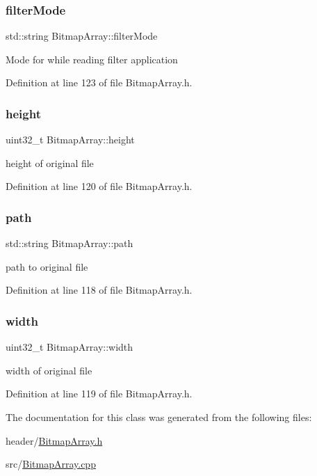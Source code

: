\subsubsection{\texorpdfstring{filterMode}{filterMode}}
{\footnotesize\ttfamily std\+::string Bitmap\+Array\+::filter\+Mode\hspace{0.3cm}{\ttfamily [private]}}

Mode for while reading filter application 

Definition at line 123 of file Bitmap\+Array.\+h.

\mbox{\label{classBitmapArray_adb8d1a8fcc55c3884ad3eea71c6042be}} 
\subsubsection{\texorpdfstring{height}{height}}
{\footnotesize\ttfamily uint32\+\_\+t Bitmap\+Array\+::height\hspace{0.3cm}{\ttfamily [private]}}

height of original file 

Definition at line 120 of file Bitmap\+Array.\+h.

\mbox{\label{classBitmapArray_a3a3e1fbdd198c6731c7f6e20fb492445}} 
\subsubsection{\texorpdfstring{path}{path}}
{\footnotesize\ttfamily std\+::string Bitmap\+Array\+::path\hspace{0.3cm}{\ttfamily [private]}}

path to original file 

Definition at line 118 of file Bitmap\+Array.\+h.

\mbox{\label{classBitmapArray_a44f51b2c1ecde3f9aa504df25d65b6c9}} 
\subsubsection{\texorpdfstring{width}{width}}
{\footnotesize\ttfamily uint32\+\_\+t Bitmap\+Array\+::width\hspace{0.3cm}{\ttfamily [private]}}

width of original file 

Definition at line 119 of file Bitmap\+Array.\+h.



The documentation for this class was generated from the following files\+:\begin{DoxyCompactItemize}
\item 
header/\mbox{\hyperlink{BitmapArray_8h}{Bitmap\+Array.\+h}}\item 
src/\mbox{\hyperlink{BitmapArray_8cpp}{Bitmap\+Array.\+cpp}}\end{DoxyCompactItemize}
